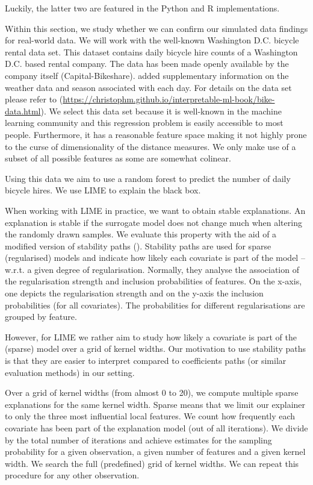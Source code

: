 \documentclass[]{krantz}
\begin{document}
Luckily, the latter two are featured in the Python and R
implementations.

Within this section, we study whether we can confirm our simulated data
findings for real-world data. We will work with the well-known
Washington D.C. bicycle rental data set. This dataset contains daily
bicycle hire counts of a Washington D.C. based rental company. The data
has been made openly available by the company itself
(Capital-Bikeshare). \citet{fanaee2014event} added supplementary
information on the weather data and season associated with each day. For
details on the data set please refer to \citet{molnar2019}
(\url{https://christophm.github.io/interpretable-ml-book/bike-data.html}).
We select this data set because it is well-known in the machine learning
community and this regression problem is easily accessible to most
people. Furthermore, it has a reasonable feature space making it not
highly prone to the curse of dimensionality of the distance measures. We
only make use of a subset of all possible features as some are somewhat
colinear.

Using this data we aim to use a random forest to predict the number of
daily bicycle hires. We use LIME to explain the black box.

When working with LIME in practice, we want to obtain stable
explanations. An explanation is stable if the surrogate model does not
change much when altering the randomly drawn samples. We evaluate this
property with the aid of a modified version of stability paths
(\citet{meinshausen2010stability}). Stability paths are used for sparse
(regularised) models and indicate how likely each covariate is part of
the model -- w.r.t. a given degree of regularisation. Normally, they
analyse the association of the regularisation strength and inclusion
probabilities of features. On the x-axis, one depicts the regularisation
strength and on the y-axis the inclusion probabilities (for all
covariates). The probabilities for different regularisations are grouped
by feature.

However, for LIME we rather aim to study how likely a covariate is part
of the (sparse) model over a grid of kernel widths. Our motivation to
use stability paths is that they are easier to interpret compared to
coefficients paths (or similar evaluation methods) in our setting.

Over a grid of kernel widths (from almost 0 to 20), we compute multiple
sparse explanations for the same kernel width. Sparse means that we
limit our explainer to only the three most influential local features.
We count how frequently each covariate has been part of the explanation
model (out of all iterations). We divide by the total number of
iterations and achieve estimates for the sampling probability for a
given observation, a given number of features and a given kernel width.
We search the full (predefined) grid of kernel widths. We can repeat
this procedure for any other observation.
\end{document}
